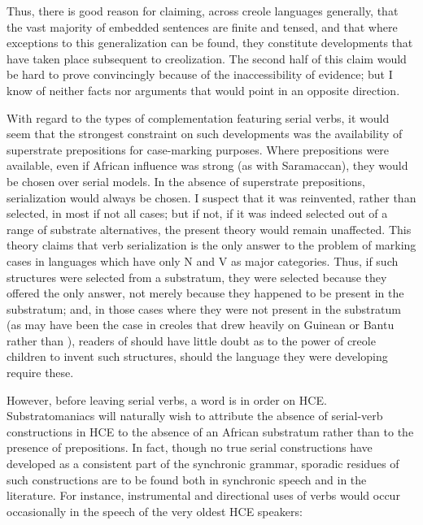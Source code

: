Thus, there is good reason for claiming, across creole languages generally, that the vast majority of embedded sentences are finite and tensed, and that where exceptions to this generalization can be found, they constitute developments that have taken place subsequent to creolization. The second half of this claim would be hard to prove convincingly because of the inaccessibility of evidence; but I know of neither facts nor arguments that would point in an opposite direction.

With regard to the types of complementation featuring serial verbs, it would seem that the strongest constraint on such developments was the availability of superstrate prepositions for case-marking purposes. Where prepositions were available, even if African influence was strong (as with Saramaccan), they would be chosen over serial models. In the absence of superstrate prepositions, serialization would always be chosen. I suspect that it was reinvented, rather than selected,
in most if not all cases; but if not, if it was indeed selected out of a range of substrate alternatives, the present theory would remain unaffected. This theory claims that verb serialization is the only answer to the problem of marking cases in languages which have only N and V as major categories. Thus, if such structures were selected from a substratum, they were selected because they offered the only answer, not merely because they happened to be present in the substratum; and, in those cases where they were not present in the substratum (as may have been the case in creoles that drew heavily on Guinean or Bantu rather than ), readers of  should have little doubt as to the power of creole children to invent such structures, should the language they were developing require these.

However, before leaving serial verbs, a word is in order on HCE. Substratomaniacs will naturally wish to attribute the absence of serial-verb constructions in HCE to the absence of an African substratum rather than to the presence of prepositions. In fact, though no true serial constructions have developed as a consistent part of the synchronic grammar, sporadic residues of such constructions are to be found both in synchronic speech and in the literature. For instance, instrumental and directional uses of verbs would occur occasionally in the speech of the very oldest HCE speakers:

